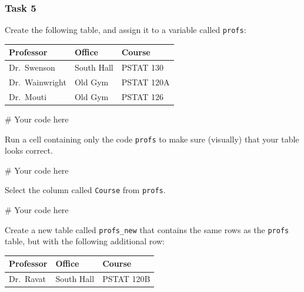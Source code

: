 \documentclass[
  11pt,
]{article}
\newenvironment{Shaded}{\begin{snugshade}}{\end{snugshade}}
\newcommand{\CommentTok}[1]{\textcolor[rgb]{0.37,0.37,0.37}{#1}}
\begin{document}
\subsubsection{Task 5}\label{task-5}

Create the following table, and assign it to a variable called
\texttt{profs}:

\begin{longtable}[]{@{}lll@{}}
\toprule\noalign{}
Professor & Office & Course \\
\midrule\noalign{}
\endhead
\bottomrule\noalign{}
\endlastfoot
Dr.~Swenson & South Hall & PSTAT 130 \\
Dr.~Wainwright & Old Gym & PSTAT 120A \\
Dr.~Mouti & Old Gym & PSTAT 126 \\
\end{longtable}

\begin{Shaded}
\begin{Highlighting}[]
\CommentTok{\# Your code here}
\end{Highlighting}
\end{Shaded}

Run a cell containing only the code \texttt{profs} to make sure
(visually) that your table looks correct.

\begin{Shaded}
\begin{Highlighting}[]
\CommentTok{\# Your code here}
\end{Highlighting}
\end{Shaded}

Select the column called \texttt{Course} from \texttt{profs}.

\begin{Shaded}
\begin{Highlighting}[]
\CommentTok{\# Your code here}
\end{Highlighting}
\end{Shaded}

Create a new table called \texttt{profs\_new} that contains the same
rows as the \texttt{profs} table, but with the following additional row:

\begin{longtable}[]{@{}lll@{}}
\toprule\noalign{}
Professor & Office & Course \\
\midrule\noalign{}
\endhead
\bottomrule\noalign{}
\endlastfoot
Dr.~Ravat & South Hall & PSTAT 120B \\
\end{longtable}
\end{document}
